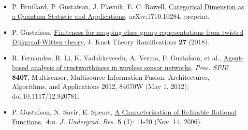   \begin{itemize}
    
  \item[] P. Bruillard, P. Gustafson, J. Plavnik, E. C. Rowell, \href{https://arxiv.org/abs/1710.10284}{Categorical Dimension as a Quantum Statistic and Applications},  arXiv:1710.10284, preprint. 
    
  \item[] P. Gustafson, \href{https://arxiv.org/abs/1610.06069}{Finiteness for mapping class group representations from twisted Dijkgraaf-Witten theory}, J. Knot Theory Ramifications \textbf{27} (2018).

  \item[] R. Fernandes, B. Li, K. Vadakkeveedu, A. Verma, P. Gustafson, et al., \href{http://proceedings.spiedigitallibrary.org/proceeding.aspx?articleid=1354959}{Agent-based analysis of trustworthiness in wireless sensor networks}, \emph{Proc. SPIE} \textbf{8407}, Multisensor, Multisource Information Fusion: Architectures, Algorithms, and Applications 2012, 84070W (May 1, 2012); doi:10.1117/12.920781. 

 \item[] P. Gustafson, N. Savir, E. Spears, \href{http://www.uni.edu/ajur/v5n3/Gufstafson\%20et\%20al\%20new\%20pp\%2011-20.pdf}{A Characterization of Refinable Rational Functions}, \emph{Am. J. Undergrad. Res.} \textbf{5} (3): 11-20 (Nov. 11, 2006).
  
 \end{itemize}
 

